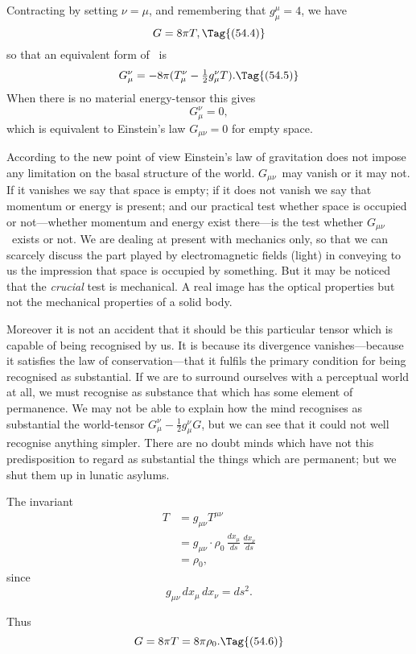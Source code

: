 \documentclass[12pt]{book}
\begin{document}
Contracting  by setting $\nu = \mu$, and remembering that $g_{\mu}^{\mu} = 4$, we have
\[
G = 8\pi T,
\Tag{(54.4)}
\]
so that an equivalent form of~ is
\[
G_{\mu}^{\nu} = -8\pi(T_{\mu}^{\nu} - \tfrac{1}{2} g_{\mu}^{\nu}T).
\Tag{(54.5)}
\]
When there is no material energy-tensor this gives
\[
G_{\mu}^{\nu} = 0,
\]
which is equivalent to Einstein's law $G_{\mu\nu} = 0$ for empty space.

According to the new point of view Einstein's law of gravitation does not
impose any limitation on the basal structure of the world. $G_{\mu\nu}$~may vanish or
it may not. If it vanishes we say that space is empty; if it does not vanish
we say that momentum or energy is present; and our practical test whether
space is occupied or not---whether momentum and energy exist there---is the
test whether $G_{\mu\nu}$~exists or not\footnotemark.\footnotetext
  {We are dealing at present with mechanics only, so that we can scarcely discuss the part
  played by electromagnetic fields (light) in conveying to us the impression that space is occupied
  by something. But it may be noticed that the \emph{crucial} test is mechanical. A real image has the
  optical properties but not the mechanical properties of a solid body.}

Moreover it is not an accident that it should be this particular tensor
which is capable of being recognised by us. It is because its divergence
vanishes---because it satisfies the law of conservation---that it fulfils the
primary condition for being recognised as substantial. If we are to surround
ourselves with a perceptual world at all, we must recognise as substance that
which has some element of permanence. We may not be able to explain how
the mind recognises as substantial the world-tensor $G_{\mu}^{\nu} - \frac{1}{2}g_{\mu}^{\nu} G$, but we can
see that it could not well recognise anything simpler. There are no doubt
minds which have not this predisposition to regard as substantial the things
which are permanent; but we shut them up in lunatic asylums.

The invariant
\begin{align*}
  T &= g_{\mu\nu} T^{\mu\nu} \\
  &= g_{\mu\nu} \cdot \rho_{0}\, \frac{dx_{\mu}}{ds}\, \frac{dx_{\nu}}{ds} \\
  &= \rho_{0},
\end{align*}
since
\[
g_{\mu\nu}\, dx_{\mu}\, dx_{\nu} = ds^{2}.
\]

Thus
\[
G = 8\pi T = 8\pi \rho_{0}.
\Tag{(54.6)}
\]
\end{document}
